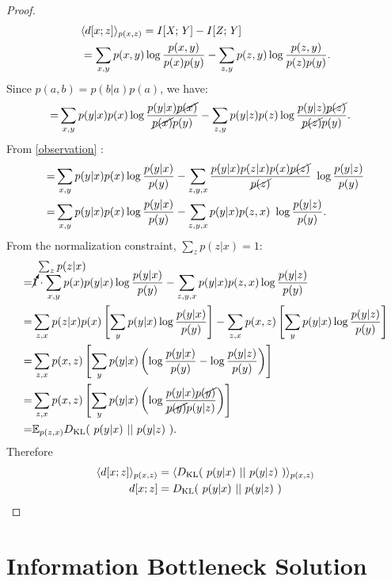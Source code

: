 \begin{proof}
	\begin{align}
		&\langle d[x;z] \rangle_{p(x,z)} =I[{\mathit{X}};{\mathit{Y}}]-I[{\mathit{Z}};{\mathit{Y}}]\nonumber\\
		&=\sum_{x,y} p(x, y) \log \frac{p(x,y)}{p(x) p(y)} - \sum_{z,y} p(z, y) \log \frac{p(z,y)}{p(z) p(y)}.
	\end{align}
	Since $p(a,b) = p(b|a) p(a)$, we have:
	\begin{align}
		=&\sum_{x,y} p(y|x) p(x) \log \frac{p(y|x)\cancel{p(x)}}{ \cancel{p(x)}p(y)} -\sum_{z,y} p(y|z) p(z) \log \frac{p(y|z)\cancel{p(z)}}{ \cancel{p(z)}p(y)}.
	\end{align}
	From \eqref{observation} :
	\begin{align}
		=&\sum_{x,y} p(y|x) p(x) \log \frac{p(y|x)}{ p(y)} - \sum_{z,y,x} \frac{p(y|x) p(z|x) p(x) \cancel{p(z)}}{\cancel{p(z)}}~\log \frac{p(y|z)}{ p(y)}\\
		=&\sum_{x,y} p(y|x) p(x) \log \frac{p(y|x)}{ p(y)} - \sum_{z,y,x} p(y|x) p(z,x)~\log \frac{p(y|z)}{ p(y)}.
	\end{align}
	From the normalization constraint, $\sum_{z} p(z|x)=1$:
	\begin{align}
		=&\cancelto{\sum_{z} p(z|x)}{1} \cdot \sum_{x,y} p(x) p(y|x) \log \frac{p(y|x)}{ p(y)} - \sum_{z,y,x} p(y|x) p(z,x)\log \frac{p(y|z)}{ p(y)}\\
		=&\sum_{z,x} p(z|x)p(x) \left[\sum_{y}  p(y|x) \log \frac{p(y|x)}{ p(y)}\right] - \sum_{z,x} p(x,z) \left[ \sum_{y} p(y|x) \log \frac{p(y|z)}{ p(y)}\right]\\
		=&\sum_{z,x} p(x,z) \left[\sum_{y}  p(y|x) \left(\log \frac{p(y|x)}{ p(y)}- \log \frac{p(y|z)}{ p(y)}\right)\right]\\
		=&\sum_{z,x} p(x,z) \left[\sum_{y}  p(y|x) \left(\log \frac{p(y|x) \cancel{p(y)}}{ \cancel{p(y)} p(y|z)}\right)\right]\\
		=&\mathbb{E}_{p(z,x)}  D_{\mathrm{KL}}{\left(~p(y|x)~ ||~ p(y|z)~ \right)}.
	\end{align}
	Therefore
	\begin{align}
		\langle d[x;z] \rangle_{p(x,z)} &= \langle D_{\mathrm{KL}}{\left(~p(y|x)~ ||~ p(y|z)~ \right)} \rangle_{p(x,z)}\\
		d[x;z] &= D_{\mathrm{KL}}{\left(~p(y|x)~ ||~ p(y|z)~ \right)}
	\end{align}
\end{proof}

\section{Information Bottleneck Solution}%

